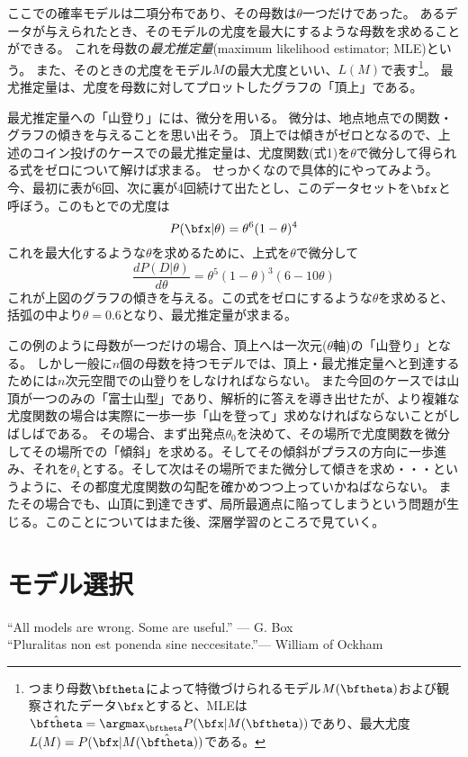 \documentclass{jsarticle}
\begin{document}
ここでの確率モデルは二項分布であり、その母数は$\theta$一つだけであった。
あるデータが与えられたとき、そのモデルの尤度を最大にするような母数を求めることができる。
これを母数の\emph{最尤推定量}(maximum likelihood estimator; MLE)という。
また、そのときの尤度をモデル$M$の最大尤度といい、$L(M)$で表す\footnote{つまり母数$\bftheta$によって特徴づけられるモデル$M(\bftheta)$および観察されたデータ$\bfx$とすると、MLEは$\hat{\bftheta} = \argmax_{\bftheta} P(\bfx|M(\bftheta))$であり、最大尤度$L(M)=P(\bfx |M(\hat{\bftheta}))$である。}。
最尤推定量は、尤度を母数に対してプロットしたグラフの「頂上」である。

最尤推定量への「山登り」には、微分を用いる。
微分は、地点地点での関数・グラフの傾きを与えることを思い出そう。
頂上では傾きがゼロとなるので、上述のコイン投げのケースでの最尤推定量は、尤度関数(式1)を$\theta$で微分して得られる式をゼロについて解けば求まる。
せっかくなので具体的にやってみよう。今、最初に表が6回、次に裏が4回続けて出たとし、このデータセットを$\bfx$と呼ぼう。このもとでの尤度は
\begin{equation}
 P(\bfx| \theta) = \theta^6 (1-\theta)^4 
\end{equation}
これを最大化するような$\theta$を求めるために、上式を$\theta$で微分して
\begin{equation}
 \frac{d P(D| \theta)}{d \theta} = \theta^5 (1-\theta)^3 (6 - 10\theta)  
\end{equation}
これが上図のグラフの傾きを与える。この式をゼロにするような$\theta$を求めると、括弧の中より$\theta = 0.6$となり、最尤推定量が求まる。

この例のように母数が一つだけの場合、頂上へは一次元($\theta$軸)の「山登り」となる。
しかし一般に$n個$の母数を持つモデルでは、頂上・最尤推定量へと到達するためには$n$次元空間での山登りをしなければならない。
また今回のケースでは山頂が一つのみの「富士山型」であり、解析的に答えを導き出せたが、より複雑な尤度関数の場合は実際に一歩一歩「山を登って」求めなければならないことがしばしばである。
その場合、まず出発点$\theta_0$を決めて、その場所で尤度関数を微分してその場所での「傾斜」を求める。そしてその傾斜がプラスの方向に一歩進み、それを$\theta_1$とする。そして次はその場所でまた微分して傾きを求め・・・というように、その都度尤度関数の勾配を確かめつつ上っていかねばならない。
またその場合でも、山頂に到達できず、局所最適点に陥ってしまうという問題が生じる。このことについてはまた後、深層学習のところで見ていく。




\section{モデル選択}
\begin{flushright}
 ``All models are wrong. Some are useful.'' --- G. Box \\  \vspace{0.3em}
 ``Pluralitas non est ponenda sine neccesitate.''--- William of Ockham \vspace{0.5em}
\end{flushright}
\end{document}
